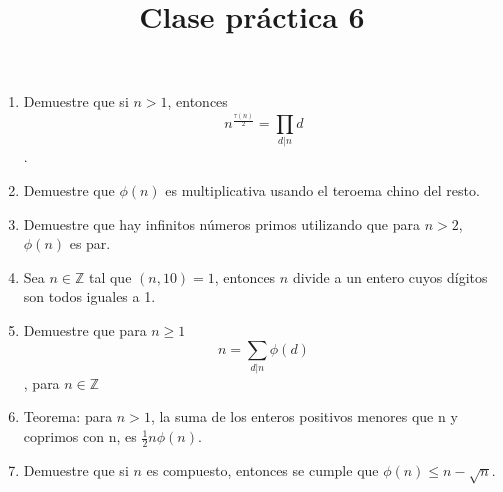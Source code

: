 \documentclass{article}
\title{Clase pr\'actica 6}
\begin{document}
\maketitle
\begin{enumerate}
	\item Demuestre que si $n>1$, entonces $$n^{\frac{\tau(n)}{2}} = \prod_{d | n} d$$.
	\item Demuestre que $\phi(n)$ es multiplicativa usando el teroema chino del resto.
	\item Demuestre que hay infinitos n\'umeros primos utilizando que para $n>2$, $\phi(n)$ es par.
	\item Sea $n \in \mathbb{Z}$ tal que $(n, 10) = 1$, entonces $n$ divide a un entero cuyos d\'igitos son todos iguales a 1.
	\item Demuestre que para $n \geq 1$
	$$n = \sum_{d|n} \phi(d)$$, para $n \in \mathbb{Z}$
	\item Teorema: para $n>1$, la suma de los enteros positivos menores que n y coprimos con n, es $\frac{1}{2}n\phi(n)$.
	\item Demuestre que si $n$ es compuesto, entonces se cumple que $\phi(n) \leq n - \sqrt{n}$.
\end{enumerate}
\end{document}
